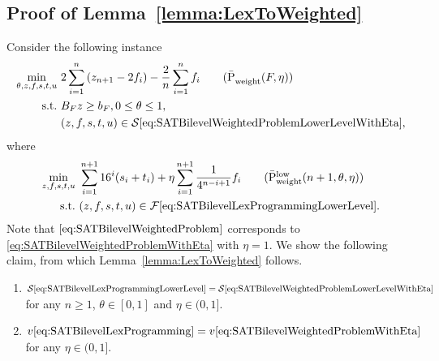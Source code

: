 \documentclass[runningheads,orivec]{llncs}
\newcommand{\MacroColor}[1]{#1}
\newcommand{\NVariables}{\MacroColor{n}}
\newcommand{\OptValFunc}{\MacroColor{v}}
\newcommand{\OptSolSet}{\MacroColor{\mathcal{S}}}
\newcommand{\FeasSolSet}{\MacroColor{\mathcal{F}}}
\newcommand{\SATBooleanFormula}{\MacroColor{F}}
\newcommand{\ReformZ}{\MacroColor{z}}
\newcommand{\ReformAugFrac}{\MacroColor{f}}
\newcommand{\LexUVar}{\MacroColor{\theta}}
\newcommand{\LexLVarS}{\MacroColor{s}}
\newcommand{\LexLVarT}{\MacroColor{t}}
\newcommand{\LexLVarU}{\MacroColor{u}}
\newcommand{\LexWeightValue}{\MacroColor{16}}
\begin{document}
\begin{appendix}
\section{Proof of Lemma~\ref{lemma:LexToWeighted}}
\label{sec:proof_of_lemma_lex_to_weighted}

Consider the following instance
\begin{align}
\min_{\LexUVar, \ReformZ, \ReformAugFrac, \LexLVarS, \LexLVarT, \LexLVarU} \ & 
2 \sum_{i = 1}^{n} \left(\ReformZ_{\NVariables + 1} - 2 \ReformAugFrac_i \right) - \frac{2}{n} \sum_{i = 1}^n \ReformAugFrac_i
\tag{$\bar{\mathrm{P}}{}_{\text{weight}}^{\text{}}(\SATBooleanFormula, \eta)$}
\label{eq:SATBilevelWeightedProblemWithEta}
\\
\text{s.t.} \ &
B_{\SATBooleanFormula} \ReformZ \ge b_{\SATBooleanFormula}, 
0 \le \LexUVar \le 1, \notag \\
&
(\ReformZ, \ReformAugFrac, \LexLVarS, \LexLVarT, \LexLVarU) 
\in
\OptSolSet\eqref{eq:SATBilevelWeightedProblemLowerLevelWithEta},
\notag 
\end{align}
where
\begin{align}
\min_{\ReformZ, \ReformAugFrac, \LexLVarS, \LexLVarT, \LexLVarU} \ & 
\sum_{i = 1}^{\NVariables + 1}
\LexWeightValue^i (\LexLVarS_i + \LexLVarT_i)
+ 
\eta \sum_{i = 1}^{\NVariables + 1} \frac{1}{4^{\NVariables - i + 1}} \ReformAugFrac_i
\tag{$\bar{\mathrm{P}}_{\text{weight}}^{\text{low}}(\NVariables + 1, \LexUVar, \eta)$}
\label{eq:SATBilevelWeightedProblemLowerLevelWithEta}
\\
\text{s.t.} \
&
(\ReformZ, \ReformAugFrac, \LexLVarS, \LexLVarT, \LexLVarU)
\in
\FeasSolSet\eqref{eq:SATBilevelLexProgrammingLowerLevel}.
\notag 
\end{align}
Note that $\eqref{eq:SATBilevelWeightedProblem}$ corresponds to \eqref{eq:SATBilevelWeightedProblemWithEta} with $\eta = 1$.
We show the following claim, from which Lemma~\ref{lemma:LexToWeighted} follows.

\begin{lemma}
\label{lemma:LexToWeightedWithEta}
\mbox{}
\begin{enumerate}
\item
$\OptSolSet\eqref{eq:SATBilevelLexProgrammingLowerLevel} = \OptSolSet\eqref{eq:SATBilevelWeightedProblemLowerLevelWithEta}$ for any $\NVariables \ge 1$, $\LexUVar \in [0, 1]$ and $\eta \in (0, 1]$.
\item
$\OptValFunc\eqref{eq:SATBilevelLexProgramming} = \OptValFunc\eqref{eq:SATBilevelWeightedProblemWithEta}$ for any $\eta \in (0, 1]$.
\end{enumerate}
\end{lemma}


\end{appendix}
\end{document}
